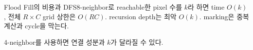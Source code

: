 \begin{frame}{Flood Fill의 비용과 DFS}8-neighbor로 reachable한 pixel 수를 $k$라 하면 time $O(k)$, 전체 $R\times C$ grid 상한은 $O(RC)$. recursion depth는 최악 $O(k)$. marking은 중복 계산과 cycle을 막는다.
\begin{takeaway}
4-neighbor를 사용하면 연결 성분과 $k$가 달라질 수 있다.
\end{takeaway}
\end{frame}
